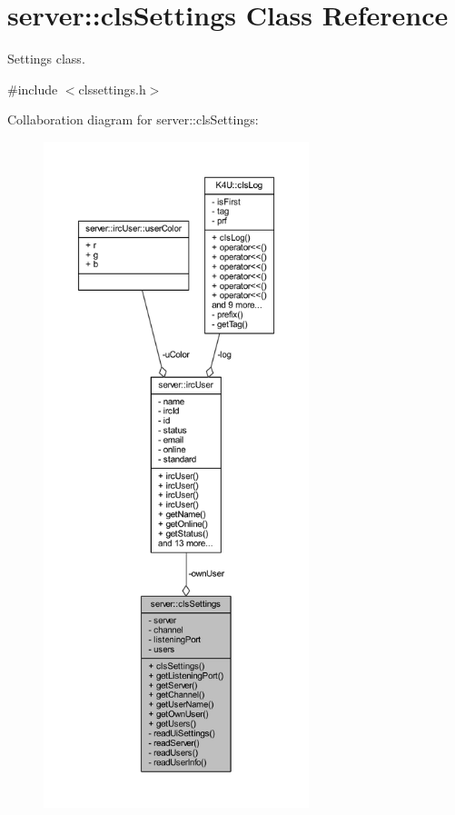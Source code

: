 \hypertarget{classserver_1_1cls_settings}{\section{server\-:\-:cls\-Settings Class Reference}
\label{d7/d81/classserver_1_1cls_settings}
}


Settings class.  




{\ttfamily \#include $<$clssettings.\-h$>$}



Collaboration diagram for server\-:\-:cls\-Settings\-:\nopagebreak
\begin{figure}[H]
\begin{center}
\leavevmode
\includegraphics[height=550pt]{d9/d5d/classserver_1_1cls_settings__coll__graph}
\end{center}
\end{figure}
